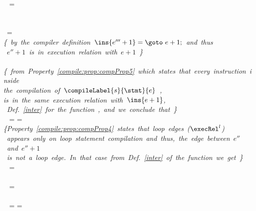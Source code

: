 \begin{description}
	 \\
	 \ 	 =  \\\\
	
			
	\mbox{ }\\
	 \ \psi =   \\ 
	\mbox{\rm\textit{\{ by the compiler definition $ \ins{e''' + 1} = \goto \ e +  1; $  and thus}} \\
	\mbox{\rm{\textit{  $e'' + 1$ is in execution relation with $e + 1$ \}} }}\\
	 \  \execRel {} \\
				
				
                               	
	\mbox{\rm\textit{\{ from Property \ref{compile:prop:compProp5} which states that every instruction inside }} \\
	\mbox{\rm\textit{the compilation of $\compileLabel{s}{\stmt}{e}$ , }} \\
        \mbox{\rm\textit{is in the same execution relation with $\ins{e+1}$, }} \\
	\mbox{\rm\textit{    Def. \ref{inter} for the function \interOnly,  and    we conclude that \} } }\\
	  \    =   = \psi\\
	\mbox{\rm\textit{\{Property \ref{compile:prop:compProp4} states that loop edges ($\execRel^{l}$) }} \\
        \mbox{\rm\textit{  appears only on loop statement compilation and thus, the edge between  $e''$ and $e'' + 1$}}\\
	\mbox{\rm\textit{ is not a loop edge. In that case from Def. \ref{inter}  of the function \interOnly{} we get \}  }} \\
	 \  =  \\
	\mbox{\rm {}}\\
	  \  =  \\
				
		\\
		\   = 	= \psi	\\
								


\end{description}

